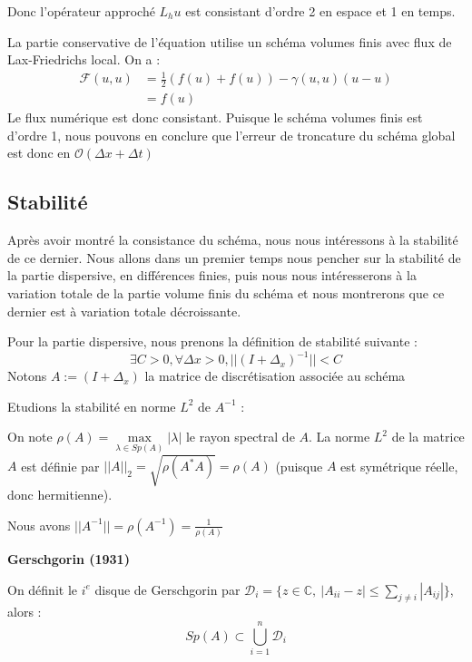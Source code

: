 Donc l'opérateur approché $L_hu$ est consistant d'ordre 2 en espace et 1 en temps. 

\vspace{1em}
La partie conservative de l'équation utilise un schéma volumes finis avec flux de Lax-Friedrichs local.
On a :
\begin{equation*}
\begin{split}
    \mathcal{F}(u,u) &= \frac{1}{2}(f(u)+f(u)) -\gamma(u,u)(u - u)\\
    &=f(u)
\end{split}
\end{equation*}
Le flux numérique est donc consistant. Puisque le schéma volumes finis est d'ordre 1, nous pouvons en conclure que l'erreur de troncature du schéma global est donc en $\mathcal{O}(\Delta x + \Delta t)$

\subsection{Stabilité}

Après avoir montré la consistance du schéma, nous nous intéressons à la stabilité de ce dernier. Nous allons dans un premier temps nous pencher sur la stabilité de la partie dispersive, en différences finies, puis nous nous intéresserons à la variation totale de la partie volume finis du schéma et nous montrerons que ce dernier est à variation totale décroissante.

\vspace{1em}
Pour la partie dispersive, nous prenons la définition de stabilité suivante :
$$\exists C >0, \forall \Delta x > 0, ||(I + \Delta_x)^{-1}||< C$$
Notons $A:= (I +\Delta_x)$ la matrice de discrétisation associée au schéma

Etudions la stabilité en norme $L^2$ de $A^{-1}$ :

\vspace{1em}

On note $\rho(A) = \underset{\lambda \in Sp(A)}{\max}|\lambda|$ le rayon spectral de $A$. 
La norme $L^2$ de la matrice $A$ est définie par $||A||_{2} = \sqrt{\rho(A^*A)} = \rho(A)$ (puisque $A$ est symétrique réelle, donc hermitienne).

Nous avons $||A^{-1}|| = \rho(A^{-1}) = \frac{1}{\rho(A)}$


\begin{theorembox}
\begin{theorem}
    \textbf{Gerschgorin (1931)}
    
    On définit le $i^e$ disque de Gerschgorin par  $ \displaystyle \mathcal{D}_i = \Big\{z \in \mathbb{C}, \ |A_{ii} - z| \leq \sum_{j \neq i} |A_{ij}| \Big\} $, alors :
    $$ Sp(A) \subset \bigcup_{i=1}^{n} \mathcal{D}_i$$
\end{theorem}
\end{theorembox}

